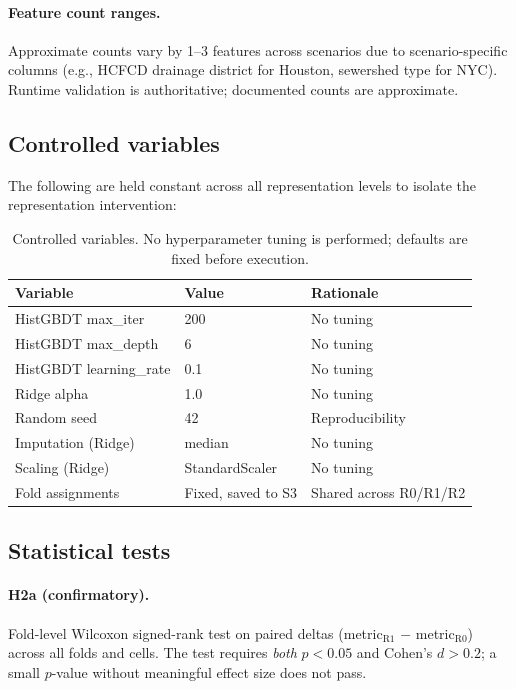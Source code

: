 \paragraph{Feature count ranges.}
Approximate counts vary by 1--3 features across scenarios due to
scenario-specific columns (e.g., HCFCD drainage district for Houston,
sewershed type for NYC). Runtime validation is authoritative; documented
counts are approximate.

\subsection{Controlled variables}
\label{app:doe-controlled}

The following are held constant across all representation levels to
isolate the representation intervention:

\begin{table}[t]
\centering
\caption{Controlled variables. No hyperparameter tuning is performed;
  defaults are fixed before execution.}
\label{app:tab:controlled}
\small
\begin{tabular}{@{}lll@{}}
\toprule
\textbf{Variable} & \textbf{Value} & \textbf{Rationale} \\
\midrule
HistGBDT max\_iter      & 200     & No tuning \\
HistGBDT max\_depth     & 6       & No tuning \\
HistGBDT learning\_rate & 0.1     & No tuning \\
Ridge alpha             & 1.0     & No tuning \\
Random seed             & 42      & Reproducibility \\
Imputation (Ridge)      & median  & No tuning \\
Scaling (Ridge)         & StandardScaler & No tuning \\
Fold assignments        & Fixed, saved to S3 & Shared across R0/R1/R2 \\
\bottomrule
\end{tabular}
\end{table}

\subsection{Statistical tests}
\label{app:doe-tests}

\paragraph{H2a (confirmatory).}
Fold-level Wilcoxon signed-rank test on paired deltas
(metric$_\text{R1}$ $-$ metric$_\text{R0}$) across all folds and cells.
The test requires \emph{both} $p < 0.05$ and Cohen's $d > 0.2$; a small
$p$-value without meaningful effect size does not pass.

